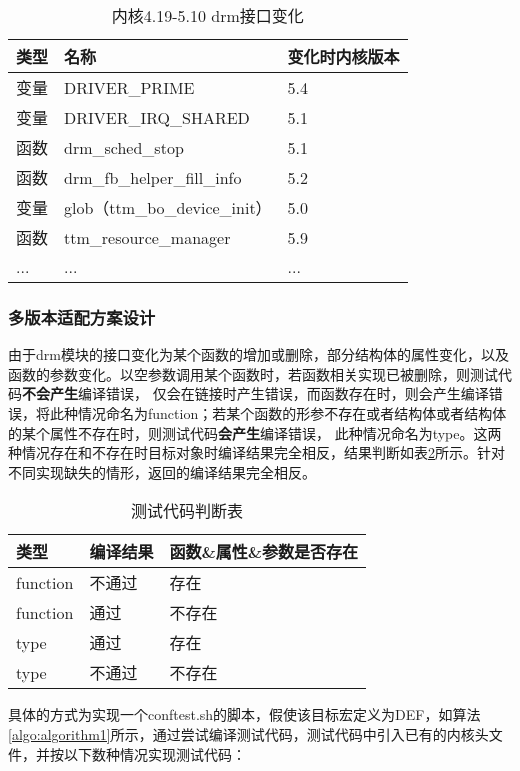 \begin{table}[h]
  \centering
  \caption{内核4.19-5.10 drm接口变化}
  \label{tab:内核4.19-5.10 drm接口变化}
  \begin{tabular}{lll}
    \toprule
    类型   &   名称  &变化时内核版本  \\
    \midrule
    变量 & DRIVER\_PRIME & 5.4 \\
    变量 & DRIVER\_IRQ\_SHARED & 5.1 \\
    函数 & drm\_sched\_stop & 5.1 \\
    函数 & drm\_fb\_helper\_fill\_info & 5.2 \\
    变量 & glob（ttm\_bo\_device\_init） & 5.0 \\
    函数 & ttm\_resource\_manager & 5.9 \\
    ... & ... & ... \\
    \bottomrule
  \end{tabular}
\end{table}

\subsubsection{多版本适配方案设计}
由于drm模块的接口变化为某个函数的增加或删除，部分结构体的属性变化，以及函数的参数变化。以空参数调用某个函数时，若函数相关实现已被删除，则测试代码\textbf{不会产生}编译错误，
仅会在链接时产生错误，而函数存在时，则会产生编译错误，将此种情况命名为function；若某个函数的形参不存在或者结构体或者结构体的某个属性不存在时，则测试代码\textbf{会产生}编译错误，
此种情况命名为type。这两种情况存在和不存在时目标对象时编译结果完全相反，结果判断如表\ref{tab:测试代码判断表}所示。针对不同实现缺失的情形，返回的编译结果完全相反。

\begin{table}[h]
  \centering
  \caption{测试代码判断表}
  \label{tab:测试代码判断表}
  \begin{tabular}{lll}
    \toprule
    类型   &   编译结果 & 函数\&属性\&参数是否存在    \\
    \midrule
    function & 不通过 & 存在 \\
    function & 通过 & 不存在 \\
    type & 通过 & 存在 \\
    type & 不通过 & 不存在 \\
    \bottomrule
  \end{tabular}
\end{table}

具体的方式为实现一个conftest.sh的脚本，假使该目标宏定义为DEF，如算法\ref{algo:algorithm1}所示，通过尝试编译测试代码，测试代码中引入已有的内核头文件，并按以下数种情况实现测试代码：

